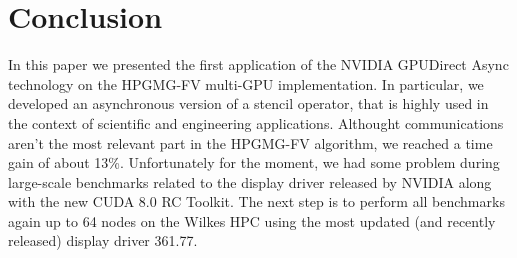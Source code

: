 \documentclass[conference]{IEEEtran}
\begin{document}
%




\section{Conclusion}

In this paper we presented the first application of the NVIDIA GPUDirect Async technology on the HPGMG-FV multi-GPU implementation.
In particular, we developed an asynchronous version of a stencil operator, that is highly used in the context of scientific and engineering applications.
Althought communications aren't the most relevant part in the HPGMG-FV algorithm, we reached a time gain of about 13\%.
Unfortunately for the moment, we had some problem during large-scale benchmarks related to the display driver released by NVIDIA along with the new CUDA 8.0 RC Toolkit.
The next step is to perform all benchmarks again up to 64 nodes on the Wilkes HPC using the most updated (and recently released) display driver 361.77.
\end{document}
